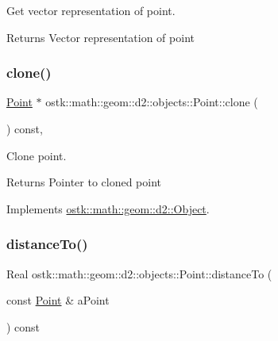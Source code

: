 Get vector representation of point. 

\begin{DoxyReturn}{Returns}
Vector representation of point 
\end{DoxyReturn}
\mbox{\label{classostk_1_1math_1_1geom_1_1d2_1_1objects_1_1_point_a8550e9fe2c23c1f38e53093f4480598d}} 
\subsubsection{\texorpdfstring{clone()}{clone()}}
{\footnotesize\ttfamily \hyperlink{classostk_1_1math_1_1geom_1_1d2_1_1objects_1_1_point}{Point} $\ast$ ostk\+::math\+::geom\+::d2\+::objects\+::\+Point\+::clone (\begin{DoxyParamCaption}{ }\end{DoxyParamCaption}) const\hspace{0.3cm}{\ttfamily [override]}, {\ttfamily [virtual]}}



Clone point. 

\begin{DoxyReturn}{Returns}
Pointer to cloned point 
\end{DoxyReturn}


Implements \hyperlink{classostk_1_1math_1_1geom_1_1d2_1_1_object_a98dedc6792aef35308966ca768eb3e14}{ostk\+::math\+::geom\+::d2\+::\+Object}.

\mbox{\label{classostk_1_1math_1_1geom_1_1d2_1_1objects_1_1_point_a6e073732f59ff702531afbcaad286ec2}} 
\subsubsection{\texorpdfstring{distance\+To()}{distanceTo()}}
{\footnotesize\ttfamily Real ostk\+::math\+::geom\+::d2\+::objects\+::\+Point\+::distance\+To (\begin{DoxyParamCaption}\item[{const \hyperlink{classostk_1_1math_1_1geom_1_1d2_1_1objects_1_1_point}{Point} \&}]{a\+Point }\end{DoxyParamCaption}) const}



